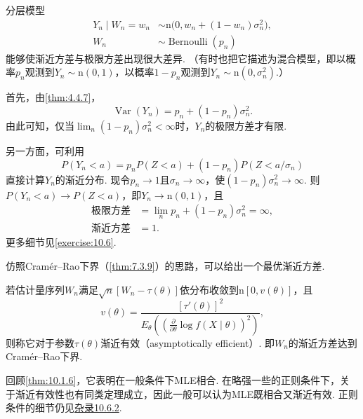 \begin{example}[大样本混合方差]\label{ex:10.1.10}
分层模型
$$\begin{aligned}
Y_n\mid W_n=w_n&\sim\mathrm n\bigl(0,w_n+(1-w_n)\sigma_n^2\bigr),\\
W_n&\sim\operatorname{Bernoulli}(p_n)
\end{aligned}$$
能够使渐近方差与极限方差出现很大差异. （有时也把它描述为混合模型，即以概率$p_n$观测到$Y_n\sim\mathrm n(0,1)$，以概率$1-p_n$观测到$Y_n\sim\mathrm n(0,\sigma_n^2)$.）

首先，由\autoref{thm:4.4.7}，
$$\operatorname{Var}(Y_n)=p_n+(1-p_n)\sigma_n^2.$$
由此可知，仅当$\lim_n(1-p_n)\sigma_n^2<\infty$时，$Y_n$的极限方差才有限.

另一方面，可利用
$$P(Y_n<a)=p_nP(Z<a)+(1-p_n)P(Z<a/\sigma_n)$$
直接计算$Y_n$的渐近分布. 现令$p_n\to1$且$\sigma_n\to\infty$，使$(1-p_n)\sigma_n^2\to\infty$. 则$P(Y_n<a)\to P(Z<a)$，即$Y_n\to\mathrm n(0,1)$，且
$$\begin{aligned}
\text{极限方差}&=\lim_n p_n+(1-p_n)\sigma_n^2=\infty,\\
\text{渐近方差}&=1.
\end{aligned}$$
更多细节见\autoref{exercise:10.6}.
\end{example}

仿照Cramér--Rao下界（\autoref{thm:7.3.9}）的思路，可以给出一个最优渐近方差.

\begin{definition}\label{def:10.1.11}
若估计量序列$W_n$满足$\sqrt n[W_n-\tau(\theta)]$依分布收敛到$\mathrm n[0,v(\theta)]$，且
$$v(\theta)=\frac{[\tau'(\theta)]^2}{E_\theta\left(\left(\frac\partial{\partial\theta}\log f(X\mid\theta)\right)^2\right)},$$
则称它对于参数$\tau(\theta)$渐近有效（asymptotically efficient）. 即$W_n$的渐近方差达到Cramér--Rao下界.
\end{definition}

回顾\autoref{thm:10.1.6}，它表明在一般条件下MLE相合. 在略强一些的正则条件下，关于渐近有效性也有同类定理成立，因此一般可以认为MLE既相合又渐近有效. 正则条件的细节仍见\hyperref[sec:10.6.2]{杂录10.6.2}.

